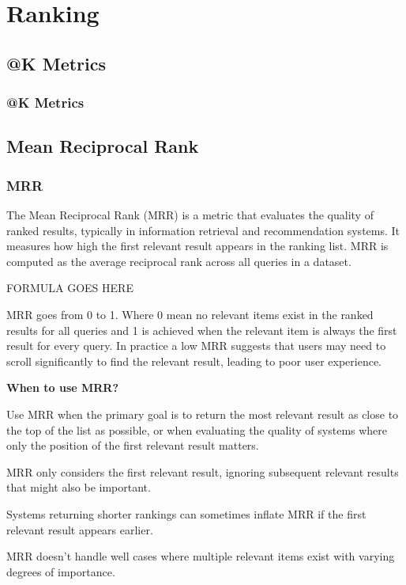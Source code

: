 \chapter{Ranking}

\clearpage
\thispagestyle{rankingstyle}
\section{@K Metrics}
\subsection{@K Metrics}

\clearpage
\thispagestyle{rankingstyle}
\section{Mean Reciprocal Rank}
\subsection{MRR}

The Mean Reciprocal Rank (MRR) is a metric that evaluates the quality of ranked results, typically in information retrieval
and recommendation systems. It measures how high the first relevant result appears in the ranking list. MRR is computed as
the average reciprocal rank across all queries in a dataset.

\begin{center}
    FORMULA GOES HERE
\end{center}

MRR goes from 0 to 1. Where 0 mean no relevant items exist in the ranked results for all queries and 1 is achieved when the
relevant item is always the first result for every query. In practice a low MRR suggests that users may need to scroll
significantly to find the relevant result, leading to poor user experience.

\textbf{When to use MRR?}

Use MRR when the primary goal is to return the most relevant result as close to the top of the list as possible, or
when evaluating the quality of systems where only the position of the first relevant result matters.

{
    \item MRR only considers the first relevant result, ignoring subsequent relevant results that might also be important.
    \item Systems returning shorter rankings can sometimes inflate MRR if the first relevant result appears earlier.
    \item MRR doesn't handle well cases where multiple relevant items exist with varying degrees of importance.

}

